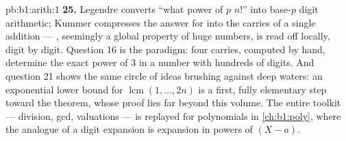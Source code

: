 \begin{solution}{pb:b1:arith:1}
\textbf{25.} Legendre converts ``what power of $p$ 
$n!$'' into base-$p$ digit arithmetic; Kummer compresses the
answer for  into the carries of a single
addition --- , seemingly a global property of huge
numbers, is read off locally, digit by digit. Question 16 is the
paradigm: four carries, computed by hand, determine the exact
power of $3$ in a number with hundreds of digits. And question 21
shows the same circle of ideas brushing against deep waters: an
exponential lower bound for $\operatorname{lcm}(1, \dots, 2n)$ is
a first, fully elementary step toward the  theorem,
whose proof lies far beyond this volume. The entire toolkit ---
division, gcd, valuations --- is replayed for polynomials in
\cref{ch:b1:poly}, where the analogue of a digit expansion is
expansion in powers of $(X - a)$.
\end{solution}
